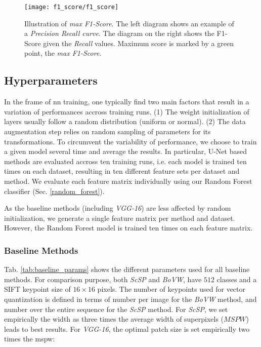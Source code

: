 \begin{figure}[ht]
  \centering
  \texttt{[image: f1\_score/f1\_score]}
  \caption[Illustration of max F1-Score]{Illustration of \textit{max F1-Score}. The left diagram shows an example of a \textit{Precision Recall curve}. The diagram on the right shows the F1-Score given the \textit{Recall} values. Maximum score is marked by a green point, the \textit{max F1-Score}.}
  \label{fig:f1_score}
\end{figure}

\subsection{Hyperparameters} \label{ch:eval_configs}
In the frame of \gls{nn} training, one typically find two main factors that result in a variation of performances accross training runs.
(1) The weight initialization of layers usually follow a random distribution (uniform or normal).
(2) The data augmentation step relies on random sampling of parameters for its transformations.
To circumvent the variability of performance, we choose to train a given model several time and average the results.
In particular, U-Net based methods are evaluated accross ten training runs, i.e. each model is trained ten times on each dataset, resulting in ten different feature sets per dataset and method.
We evaluate each feature matrix individually using our Random Forest classifier (Sec. \ref{random_forest}).

As the baseline methods (including \textit{VGG-16}) are less affected by random initialization, we generate a single feature matrix per method and dataset.
However, the Random Forest model is trained ten times on each feature matrix.

\subsubsection{Baseline Methods}
Tab. \ref{tab:baseline_params} shows the different parameters used for all baseline methods.
For comparison purpose, both \textit{ScSP} and \textit{BoVW}, have $512$ classes and a SIFT keypoint size of $16 \times 16$ pixels.
The number of keypoints used for vector quantization is defined in terms of number per image for the \textit{BoVW} method, and number over the entire sequence for the \textit{ScSP} method.
For \textit{ScSP}, we set empirically the width as three times the average width of superpixels ($MSPW$) leads to best results.
For \textit{VGG-16}, the optimal patch size is set empirically two times the \gls{mspw}:

